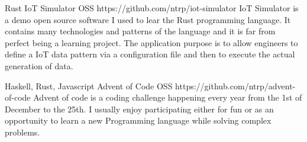 
\begin{cventries}

  \cventry
    {Rust} %
    {IoT Simulator} %
    {OSS} %
    {https://github.com/ntrp/iot-simulator} %
    {IoT Simulator is a demo open source software I used to lear the Rust programming language. 
    It contains many technologies and patterns of the language and it is far from perfect being a learning project. 
    The application purpose is to allow engineers to define a IoT data pattern via a configuration file and then to execute the actual generation of data.
    }

  \cventry
    {Haskell, Rust, Javascript} %
    {Advent of Code} %
    {OSS} %
    {https://github.com/ntrp/advent-of-code} %
    {Advent of code is a coding challenge happening every year from the 1st of December to the 25th.
    I usually enjoy participating either for fun or as an opportunity to learn a new Programming language while solving complex problems.
    }

\end{cventries}
